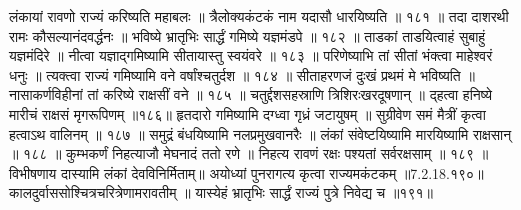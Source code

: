 लंकायां रावणो राज्यं करिष्यति महाबलः ॥
त्रैलोक्यकंटकं नाम यदासौ धारयिष्यति ॥ १८१ ॥
तदा दाशरथी रामः कौसल्यानंदवर्द्धनः ॥
भविष्ये भ्रातृभिः सार्द्धं गमिष्ये यज्ञमंडपे ॥ १८२ ॥
ताडकां ताडयित्वाहं सुबाहुं यज्ञमंदिरे ॥
नीत्वा यज्ञाद्गमिष्यामि सीतायास्तु स्वयंवरे ॥ १८३ ॥
परिणेष्याभि तां सीतां भंक्त्वा माहेश्वरं धनुः ॥
त्यक्त्वा राज्यं गमिष्यामि वने वर्षांश्चतुर्दश ॥ १८४ ॥
सीताहरणजं दुःखं प्रथमं मे भविष्यति ॥
नासाकर्णविहीनां तां करिष्ये राक्षसीं वने ॥ १८५ ॥
चतुर्द्दशसहस्राणि त्रिशिरःखरदूषणान् ॥
द्हत्वा हनिष्ये मारीचं राक्षसं मृगरूपिणम् ॥१८६॥
हृतदारो गमिष्यामि दग्ध्वा गृध्रं जटायुषम् ॥
सुग्रीवेण समं मैत्रीं कृत्वा हत्वाऽथ वालिनम् ॥ १८७ ॥
समुद्रं बंधयिष्यामि नलप्रमुखवानरैः ॥
लंकां संवेष्टयिष्यामि मारयिष्यामि राक्षसान् ॥ १८८ ॥
कुम्भकर्णं निहत्याजौ मेघनादं ततो रणे ॥
निहत्य रावणं रक्षः पश्यतां सर्वरक्षसाम् ॥ १८९ ॥
विभीषणाय दास्यामि लंकां देवविनिर्मिताम्॥
अयोध्यां पुनरागत्य कृत्वा राज्यमकंटकम् ॥7.2.18.१९०॥
कालदुर्वाससोश्चित्रचरित्रेणामरावतीम् ॥
यास्येहं भ्रातृभिः सार्द्धं राज्यं पुत्रे निवेद्य च ॥१९१॥